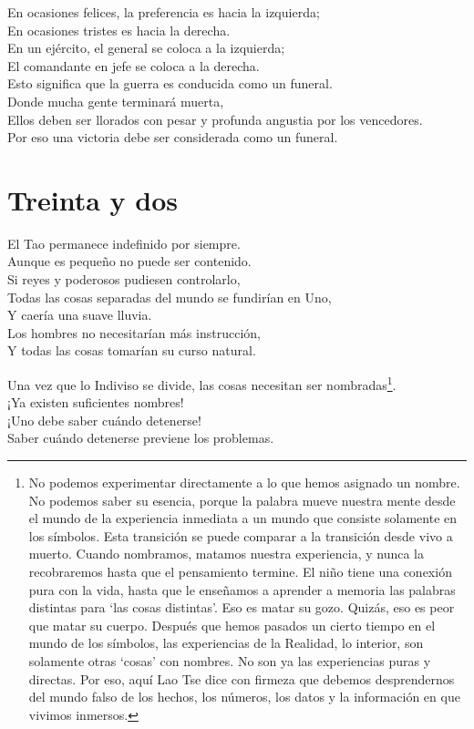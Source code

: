 \documentclass[hidelinks]{memoir}
\begin{document}
	En ocasiones felices, la preferencia es hacia la izquierda;\\
	En ocasiones tristes es hacia la derecha.\\
	En un ejército, el general se coloca a la izquierda;\\
	El comandante en jefe se coloca a la derecha.\\
	Esto significa que la guerra es conducida como un funeral.\\
	Donde mucha gente terminará muerta,\\
	Ellos deben ser llorados con pesar y profunda angustia por los
	vencedores.\\
	Por eso una victoria debe ser considerada como un funeral.
	
	\chapter*{Treinta y dos}
	
	El Tao permanece indefinido por siempre.\\
	Aunque es pequeño no puede ser contenido.\\
	Si reyes y poderosos pudiesen controlarlo,\\
	Todas las cosas separadas del mundo se fundirían en Uno,\\
	Y caería una suave lluvia.\\
	Los hombres no necesitarían más instrucción,\\
	Y todas las cosas tomarían su curso natural.
	
	Una vez que lo Indiviso se divide, las cosas necesitan ser nombradas\footnote{No podemos experimentar directamente a lo que hemos asignado un
		nombre. No podemos saber su esencia, porque la palabra mueve nuestra
		mente desde el mundo de la experiencia inmediata a un mundo que consiste
		solamente en los símbolos. Esta transición se puede comparar a la
		transición desde vivo a muerto. Cuando nombramos, matamos nuestra
		experiencia, y nunca la recobraremos hasta que el pensamiento termine.
		El niño tiene una conexión pura con la vida, hasta que le enseñamos a
		aprender a memoria las palabras distintas para `las cosas distintas'.
		Eso es matar su gozo. Quizás, eso es peor que matar su cuerpo. Después
		que hemos pasados un cierto tiempo en el mundo de los símbolos, las
		experiencias de la Realidad, lo interior, son solamente otras `cosas'
		con nombres. No son ya las experiencias puras y directas. Por eso, aquí
		Lao Tse dice con firmeza que debemos desprendernos del mundo falso de
		los hechos, los números, los datos y la información en que vivimos
		inmersos.}.\\
	¡Ya existen suficientes nombres!\\
	¡Uno debe saber cuándo detenerse!\\
	Saber cuándo detenerse previene los problemas.
	
\end{document}
